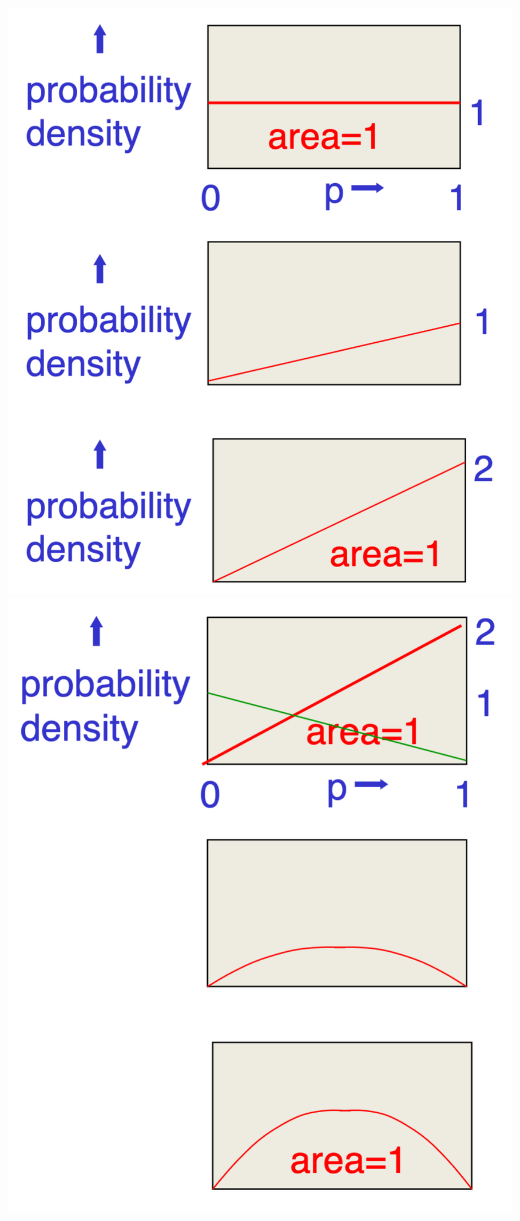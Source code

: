 \documentclass[11pt]{article}
\theoremstyle{definition}
\begin{document}
\includegraphics[width=\textwidth/3-4.16101pt]{6.png}
\includegraphics[width=\textwidth/3]{7.png}
\end{document}
